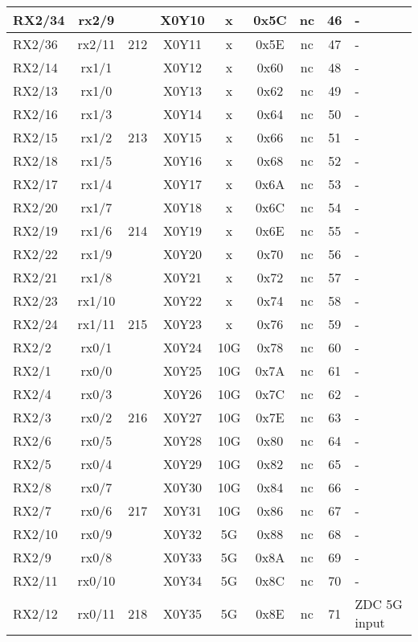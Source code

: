 \begin{longtable}{|l|c|c|c|c|c|c|c|l|}
RX2/34 & rx2/9  &     & X0Y10 &  x  & 0x5C & nc & 46 & -\\\hline
RX2/36 & rx2/11 & 212 & X0Y11 &  x  & 0x5E & nc & 47 & -\\\hline
RX2/14 & rx1/1  &     & X0Y12 &  x  & 0x60 & nc & 48 & -\\\hline
RX2/13 & rx1/0  &     & X0Y13 &  x  & 0x62 & nc & 49 & -\\\hline
RX2/16 & rx1/3  &     & X0Y14 &  x  & 0x64 & nc & 50 & -\\\hline
RX2/15 & rx1/2  & 213 & X0Y15 &  x  & 0x66 & nc & 51 & -\\\hline
RX2/18 & rx1/5  &     & X0Y16 &  x  & 0x68 & nc & 52 & -\\\hline
RX2/17 & rx1/4  &     & X0Y17 &  x  & 0x6A & nc & 53 & -\\\hline
RX2/20 & rx1/7  &     & X0Y18 &  x  & 0x6C & nc & 54 & -\\\hline
RX2/19 & rx1/6  & 214 & X0Y19 &  x  & 0x6E & nc & 55 & -\\\hline
RX2/22 & rx1/9  &     & X0Y20 &  x  & 0x70 & nc & 56 & -\\\hline
RX2/21 & rx1/8  &     & X0Y21 &  x  & 0x72 & nc & 57 & -\\\hline
RX2/23 & rx1/10 &     & X0Y22 &  x  & 0x74 & nc & 58 & -\\\hline
RX2/24 & rx1/11 & 215 & X0Y23 &  x  & 0x76 & nc & 59 & -\\\hline
RX2/2  & rx0/1  &     & X0Y24 & 10G & 0x78 & nc & 60 & -\\\hline
RX2/1  & rx0/0  &     & X0Y25 & 10G & 0x7A & nc & 61 & -\\\hline
RX2/4  & rx0/3  &     & X0Y26 & 10G & 0x7C & nc & 62 & -\\\hline
RX2/3  & rx0/2  & 216 & X0Y27 & 10G & 0x7E & nc & 63 & -\\\hline
RX2/6  & rx0/5  &     & X0Y28 & 10G & 0x80 & nc & 64 & -\\\hline
RX2/5  & rx0/4  &     & X0Y29 & 10G & 0x82 & nc & 65 & -\\\hline
RX2/8  & rx0/7  &     & X0Y30 & 10G & 0x84 & nc & 66 & -\\\hline
RX2/7  & rx0/6  & 217 & X0Y31 & 10G & 0x86 & nc & 67 & -\\\hline
RX2/10 & rx0/9  &     & X0Y32 &  5G & 0x88 & nc & 68 & -\\\hline
RX2/9  & rx0/8  &     & X0Y33 &  5G & 0x8A & nc & 69 & -\\\hline
RX2/11 & rx0/10 &     & X0Y34 &  5G & 0x8C & nc & 70 & -\\\hline
RX2/12 & rx0/11 & 218 & X0Y35 &  5G & 0x8E & nc & 71 & ZDC 5G input\\\hline
\end{longtable}

